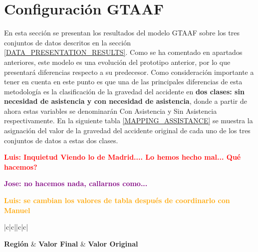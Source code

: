 \documentclass{uathesis-es}
\begin{document}
{\section{Configuración GTAAF}


En esta sección se presentan los resultados del modelo GTAAF sobre los tres conjuntos de datos descritos en la sección \ref{DATA_PRESENTATION_RESULTS}. Como se ha comentado en apartados anteriores, este modelo es una evolución del prototipo anterior, por lo que presentará diferencias respecto a su predecesor. Como consideración importante a tener en cuenta en este punto es que una de las principales diferencias de esta metodología es la clasificación de la gravedad del accidente en \textbf{dos clases: sin necesidad de asistencia y con necesidad de asistencia}, donde a partir de ahora estas variables se denominarán Con Asistencia y Sin Asistencia respectivamente. En la siguiente tabla \ref{MAPPING_ASSISTANCE} se muestra la asignación del valor de la gravedad del accidente original de cada uno de los tres conjuntos de datos a estas dos clases.

\textcolor{red}{\textbf{Luis: Inquietud Viendo lo de Madrid.... Lo hemos hecho mal... Qué hacemos?}}

\textcolor{purple}{\textbf{Jose: no hacemos nada, callarnos como...}}

\textcolor{orange}{\textbf{Luis: se cambian los valores de tabla después de coordinarlo con Manuel}}

\begin{table}[H]
    \begin{center}
        \begin{tabular}{|c|c||c|c|}
        \hline
         \\ \hline

        \textbf{Región} & \textbf{Valor Final} & \textbf{Valor Original}
        \\ \hline \hline
    

\end{tabular}
\end{center}
\end{table}}
\end{document}
